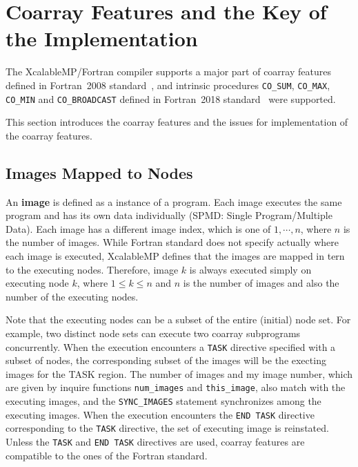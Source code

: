 \section{Coarray Features and the Key of the Implementation}\label{sec:lang}

The XcalableMP/Fortran compiler supports a major part of coarray features defined in 
Fortran~2008 standard~\cite{F08}, and intrinsic procedures 
{\tt CO\_SUM}, {\tt CO\_MAX}, {\tt CO\_MIN} and {\tt CO\_BROADCAST} defined in 
Fortran~2018 standard~\cite{F18} were supported.

This section introduces the coarray features and the issues for implementation of 
the coarray features.

\subsection{Images Mapped to Nodes}

An {\bf image} is defined as a instance of a program. 
Each image executes the same program and has its own data individually 
(SPMD: Single Program/Multiple Data).
Each image has a different image index, which is one of $1, \cdots, n$, 
where $n$ is the number of images. 
While Fortran standard does not specify actually where each image is executed, 
XcalableMP defines that the images are mapped in tern to the executing nodes. 
Therefore, image $k$ is always executed simply on executing node $k$, 
where $1 \leq k \leq n$ and 
$n$ is the number of images and also the number of the executing nodes. 

Note that the executing nodes can be a subset of the entire (initial) node set. 
For example, two distinct node sets can execute two coarray subprograms concurrently.
When the execution encounters a {\tt TASK} directive specified with a subset of nodes,
the corresponding subset of the images will be the execting images for the
TASK region. 
The number of images and my image number, which are given by inquire functions
{\tt num\_images} and {\tt this\_image}, also match with the executing images, and
the {\tt SYNC\_IMAGES} statement synchronizes among the executing images.
When the execution encounters the {\tt END TASK} directive corresponding to the
{\tt TASK} directive, the set of executing image is reinstated.
Unless the {\tt TASK} and {\tt END TASK} directives are used, coarray features are 
compatible to the ones of the Fortran standard. 

